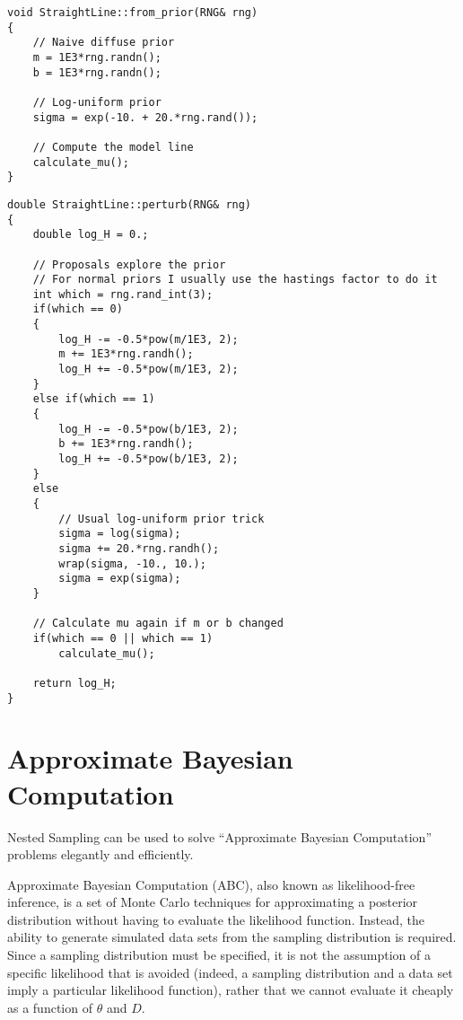 \documentclass[a4paper, 12pt]{article}
\newcommand{\params}{\theta}
\newcommand{\data}{D}
\begin{document}
\begin{verbatim}
void StraightLine::from_prior(RNG& rng)
{
    // Naive diffuse prior
    m = 1E3*rng.randn();
    b = 1E3*rng.randn();

    // Log-uniform prior
    sigma = exp(-10. + 20.*rng.rand());

    // Compute the model line
    calculate_mu();
}
\end{verbatim}

\begin{verbatim}
double StraightLine::perturb(RNG& rng)
{
    double log_H = 0.;

    // Proposals explore the prior
    // For normal priors I usually use the hastings factor to do it
    int which = rng.rand_int(3);
    if(which == 0)
    {
        log_H -= -0.5*pow(m/1E3, 2);
        m += 1E3*rng.randh();
        log_H += -0.5*pow(m/1E3, 2);
    }
    else if(which == 1)
    {
        log_H -= -0.5*pow(b/1E3, 2);
        b += 1E3*rng.randh();
        log_H += -0.5*pow(b/1E3, 2);
    }
    else
    {
        // Usual log-uniform prior trick
        sigma = log(sigma);
        sigma += 20.*rng.randh();
        wrap(sigma, -10., 10.);
        sigma = exp(sigma);
    }

    // Calculate mu again if m or b changed
    if(which == 0 || which == 1)
        calculate_mu();

    return log_H;
}
\end{verbatim}



\subsection{}

\section{Approximate Bayesian Computation}
Nested Sampling can be used to solve ``Approximate Bayesian Computation''
problems elegantly and efficiently.

Approximate Bayesian Computation (ABC), also known as likelihood-free inference,
is a set of Monte Carlo techniques for approximating a posterior distribution
without having to evaluate the likelihood function. Instead, the ability to
generate simulated data sets from the sampling distribution is required.
Since a sampling distribution must be specified, it is not the assumption of
a specific likelihood that is avoided (indeed, a sampling distribution and
a data set imply a particular likelihood function), rather that we cannot
evaluate it cheaply as a function of $\params$ and $\data$.
\end{document}
